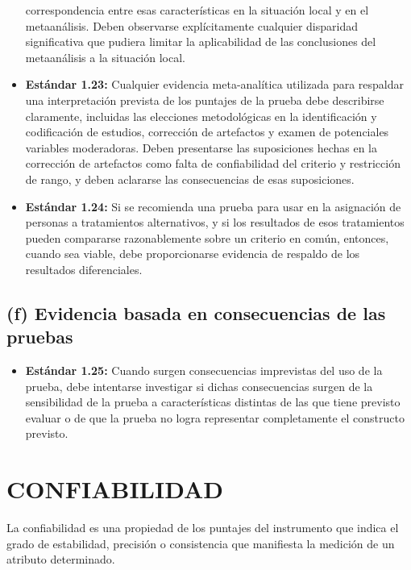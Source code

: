 \documentclass[
  letterpaper,
  DIV=11,
  numbers=noendperiod]{scrreprt}
\providecommand{\tightlist}{%
  \setlength{\itemsep}{0pt}\setlength{\parskip}{0pt}}
\begin{document}
\begin{itemize}
  correspondencia entre esas características en la situación local y en
  el metaanálisis. Deben observarse explícitamente cualquier disparidad
  significativa que pudiera limitar la aplicabilidad de las conclusiones
  del metaanálisis a la situación local.
\item
  \textbf{Estándar 1.23:} Cualquier evidencia meta-analítica utilizada
  para respaldar una interpretación prevista de los puntajes de la
  prueba debe describirse claramente, incluidas las elecciones
  metodológicas en la identificación y codificación de estudios,
  corrección de artefactos y examen de potenciales variables
  moderadoras. Deben presentarse las suposiciones hechas en la
  corrección de artefactos como falta de confiabilidad del criterio y
  restricción de rango, y deben aclararse las consecuencias de esas
  suposiciones.
\item
  \textbf{Estándar 1.24:} Si se recomienda una prueba para usar en la
  asignación de personas a tratamientos alternativos, y si los
  resultados de esos tratamientos pueden compararse razonablemente sobre
  un criterio en común, entonces, cuando sea viable, debe proporcionarse
  evidencia de respaldo de los resultados diferenciales.
\end{itemize}

\subsection{(f) Evidencia basada en consecuencias de las
pruebas}\label{f-evidencia-basada-en-consecuencias-de-las-pruebas}

\begin{itemize}
\tightlist
\item
  \textbf{Estándar 1.25:} Cuando surgen consecuencias imprevistas del
  uso de la prueba, debe intentarse investigar si dichas consecuencias
  surgen de la sensibilidad de la prueba a características distintas de
  las que tiene previsto evaluar o de que la prueba no logra representar
  completamente el constructo previsto.
\end{itemize}

\section{CONFIABILIDAD}

La confiabilidad es una propiedad de los puntajes del instrumento que
indica el grado de estabilidad, precisión o consistencia que manifiesta
la medición de un atributo determinado.
\end{document}
